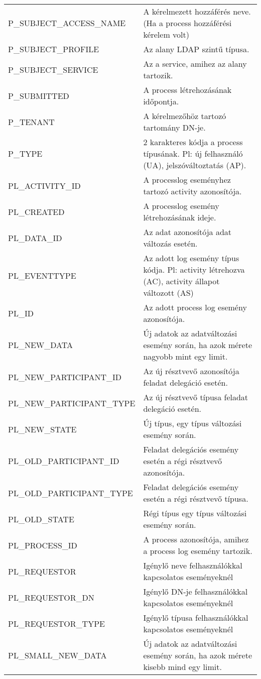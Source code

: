 \begin{longtable}{lp{10cm}}
		P\_SUBJECT\_ACCESS\_NAME & A kérelmezett hozzáférés neve. (Ha a process hozzáférési kérelem volt) \\
		P\_SUBJECT\_PROFILE & Az alany LDAP szintű típusa. \\
		P\_SUBJECT\_SERVICE & Az a service, amihez az alany tartozik. \\
		P\_SUBMITTED & A process létrehozásának időpontja. \\
		P\_TENANT & A kérelmezőhöz tartozó tartomány DN-je. \\
		P\_TYPE & 2 karakteres kódja a process típusának. Pl: új felhasználó (UA), jelszóváltoztatás (AP). \\
		PL\_ACTIVITY\_ID & A processlog eseményhez tartozó activity azonosítója. \\
		PL\_CREATED & A processlog esemény létrehozásának ideje. \\
		PL\_DATA\_ID & Az adat azonosítója adat változás esetén. \\
		PL\_EVENTTYPE & Az adott log esemény típus kódja. Pl: activity létrehozva (AC), activity állapot változott (AS) \\
		PL\_ID & Az adott process log esemény azonosítója. \\
		PL\_NEW\_DATA & Új adatok az adatváltozási esemény során, ha azok mérete nagyobb mint egy limit. \\
		PL\_NEW\_PARTICIPANT\_ID & Az új résztvevő azonosítója feladat delegáció esetén. \\
		PL\_NEW\_PARTICIPANT\_TYPE & Az új résztvevő típusa feladat delegáció esetén. \\
		PL\_NEW\_STATE & Új típus, egy típus változási esemény során. \\
		PL\_OLD\_PARTICIPANT\_ID & Feladat delegációs esemény esetén a régi résztvevő azonosítója. \\
		PL\_OLD\_PARTICIPANT\_TYPE & Feladat delegációs esemény esetén a régi résztvevő típusa. \\
		PL\_OLD\_STATE & Régi típus egy típus változási esemény során. \\
		PL\_PROCESS\_ID & A process azonosítója, amihez a process log esemény tartozik. \\
		PL\_REQUESTOR & Igénylő neve felhasználókkal kapcsolatos eseményeknél \\
		PL\_REQUESTOR\_DN & Igénylő DN-je felhasználókkal kapcsolatos eseményeknél \\
		PL\_REQUESTOR\_TYPE & Igénylő típusa felhasználókkal kapcsolatos eseményeknél \\
		PL\_SMALL\_NEW\_DATA & Új adatok az adatváltozási esemény során, ha azok mérete kisebb mind egy limit. \\
		
\end{longtable}%
\restoregeometry
\endgroup

